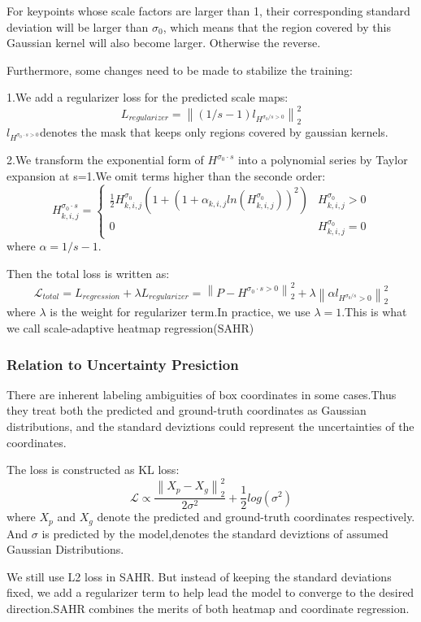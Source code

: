 \documentclass[11pt]{article}
\begin{document}
For keypoints whose scale factors are larger than 1, their corresponding standard deviation will be larger than $\sigma_0$, which means that the region covered by this Gaussian kernel will also become larger. Otherwise the reverse.

Furthermore, some changes need to be made to stabilize the training:

\noindent1.We add a regularizer loss for the predicted scale maps:$$L_{regularizer}=\left \|(1/s-1)l_{H^{\sigma_0/s>0}} \right \|^2_2$$
$l_{H^{\sigma_0\cdot s>0}}$denotes the mask that keeps only regions covered by gaussian kernels.

\noindent2.We transform the exponential form of $H^{\sigma_0\cdot s}$ into a polynomial series by Taylor expansion at s=1.We omit terms higher than the seconde order:$$H^{\sigma_0\cdot s}_{k,i,j}=\left\{\begin{matrix}
	\frac{1}{2}H^{\sigma_0}_{k,i,j}(1+(1+\alpha_{k,i,j}ln(H^{\sigma_0}_{k,i,j}))^2) &H^{\sigma_0}_{k,i,j}>0\\ 
	0 &H^{\sigma_0}_{k,i,j}=0 
\end{matrix}\right.$$
where $\alpha = 1/s-1$.

Then the total loss is written as:
$$\mathcal{L}_{total}=L_{regression}+\lambda L_{regularizer}=\left \|P-H^{\sigma_0\cdot s>0} \right \|^2_2+\lambda\left \|\alpha l_{H^{\sigma_0/s}>0} \right \|^2_2$$
where $\lambda$ is the weight for regularizer term.In practice, we use $\lambda = 1$.This is what we call scale-adaptive heatmap regression(SAHR)
\subsubsection{Relation to Uncertainty Presiction}
There are inherent labeling ambiguities of box coordinates in some cases.Thus they treat both the predicted and ground-truth coordinates as Gaussian distributions, and the standard deviztions could represent the uncertainties of the coordinates.

The loss is constructed as KL loss:$$\mathcal{L}\propto \frac{\left \|X_p-X_g \right \|^2_2}{2\sigma^2} + \frac{1}{2}log(\sigma^2)$$
where $X_p$ and $X_g$ denote the predicted and ground-truth coordinates respectively. And $\sigma$ is predicted by the model,denotes the standard deviztions of assumed Gaussian Distributions.

We still use L2 loss in SAHR. But instead of keeping the standard deviations fixed, we add a regularizer term to help lead the model to converge to the desired direction.SAHR combines the merits of both heatmap and coordinate regression.
\end{document}
